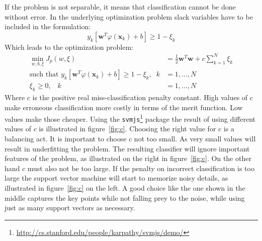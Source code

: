 If the problem is not separable, it means that classification cannot be done without error. In the underlying optimization problem slack variables have to be included in the formulation:
\begin{equation}
y_k [\mathbf{w}^T \varphi(\mathbf{x}_k) + b] \geq 1 - \xi_k
\end{equation}
Which leads to the optimization problem:
\begin{align}
\min_{w,b,\xi} J_p(w,\xi) &= \frac{1}{2}\mathbf{w}^T\mathbf{w} + c \sum_{k = 1}^N \xi_k \\
\text{such that }   y_k [\mathbf{w}^T \varphi(\mathbf{x}_k) + b] \geq 1 - \xi_k, \;\; k &= 1,\dots,N \\
\xi_k \geq 0, \;\;\; k &= 1,\dots,N 
\end{align}
Where $c$ is the positive real miss-classification penalty constant. High values of $c$ make erroneous classification more costly in terms of the merit function.  Low values make those cheaper. Using the \texttt{svmjs}\footnote{\url{http://cs.stanford.edu/people/karpathy/svmjs/demo/}} package the result of using different values of $c$ is illustrated in figure~\ref{fig:c}. Choosing the right value for $c$ is a balancing act. It is important to choose $c$ not too small. As very small values will result in underfitting the problem. The resulting classifier will ignore important features of the problem, as illustrated on the right in figure~\ref{fig:c}. On the other hand  $c$ must also not be too large. If the penalty on incorrect classification is too large the support vector machine will start to memorize noisy details, as illustrated in figure~\ref{fig:c} on the left. A good choice like the one shown in the middle captures the key points while not falling prey to the noise, while using just as many support vectors as necessary. 

